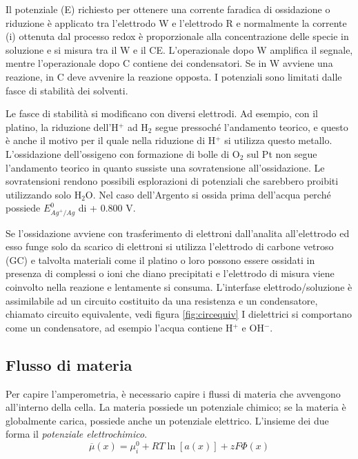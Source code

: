 
Il potenziale (E) richiesto per ottenere una corrente faradica di ossidazione o riduzione è applicato tra l'elettrodo W e l'elettrodo R e normalmente la corrente (i) ottenuta dal processo redox è proporzionale alla concentrazione delle specie in soluzione e si misura tra il W e il CE.
L'operazionale dopo W amplifica il segnale, mentre l'operazionale dopo C contiene dei condensatori.
Se in W avviene una reazione, in C deve avvenire la reazione opposta.
I potenziali sono limitati dalle fasce di stabilità dei solventi.

Le fasce di stabilità si modificano con diversi elettrodi.
Ad esempio, con il platino, la riduzione dell'H$^+$ ad H$_2$ segue pressoché l'andamento teorico, e questo è anche il motivo per il quale nella riduzione di H$^+$ si utilizza questo metallo.
L'ossidazione dell'ossigeno con formazione di bolle di O$_2$ sul Pt non segue l'andamento teorico in quanto sussiste una sovratensione all'ossidazione.
Le sovratensioni rendono possibili esplorazioni di potenziali che sarebbero proibiti utilizzando solo H$_2$O.
Nel caso dell'Argento si ossida prima dell'acqua perché possiede $E^0_{Ag^+/Ag}$ di + 0.800 V.


Se l'ossidazione avviene con trasferimento di elettroni dall'analita all'elettrodo ed esso funge solo da scarico di elettroni si utilizza l'elettrodo di carbone vetroso (GC) e talvolta materiali come il platino o loro possono essere ossidati in presenza di complessi o ioni che diano precipitati e l'elettrodo di misura viene coinvolto nella reazione e lentamente si consuma.
L'interfase elettrodo/soluzione è assimilabile ad un circuito costituito da una resistenza e un condensatore, chiamato circuito equivalente, vedi figura \ref{fig:circequiv}
I dielettrici si comportano come un condensatore, ad esempio l'acqua contiene H$^+$ e OH$^-$.

\subsection{Flusso di materia}
Per capire l'amperometria, è necessario capire i flussi di materia che avvengono all'interno della cella.
La materia possiede un potenziale chimico; se la materia è globalmente carica, possiede anche un potenziale elettrico.
L'insieme dei due forma il \emph{potenziale elettrochimico}.
\[
\overline{\mu}(x) = \mu^0_i + RT \ln [a(x)] + z F \Phi (x)
\]

